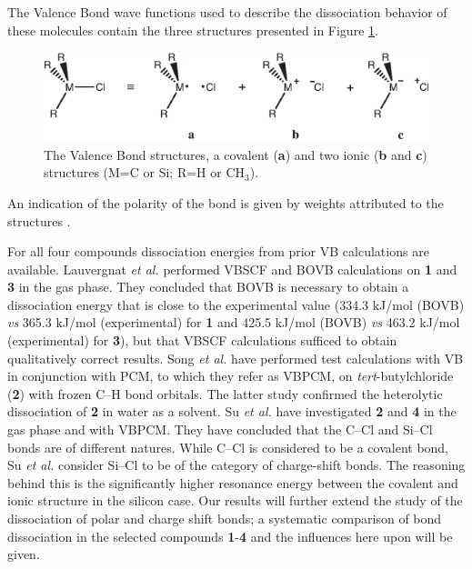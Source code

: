 The Valence Bond wave functions used to describe the dissociation behavior of these molecules contain the three structures presented in Figure \ref{ch3.fig.structures}.
\begin{figure}[htbp]
\begin{center}
\includegraphics{dissociation/figures/structures.eps}
\end{center}
\caption{The Valence Bond structures, a covalent (\textbf{a}) and two ionic (\textbf{b} and \textbf{c}) structures (M=C or Si; R=H or CH$_3$).}
\label{ch3.fig.structures}
\end{figure}
An indication of the polarity of the bond is given by weights attributed to the structures \cite{coulson}. 

For all four compounds dissociation energies from prior VB calculations are available. Lauvergnat \textit{et al.} \cite{lauvergnat} performed VBSCF \cite{vbscf1,vbscf2} and BOVB \cite{bovb1,bovb2,bovb3} calculations on \textbf{1} and \textbf{3} in the gas phase. They concluded that BOVB is necessary to obtain a dissociation energy that is close to the experimental value (334.3 kJ/mol (BOVB) \textit{vs} 365.3 kJ/mol (experimental) for \textbf{1} and 425.5 kJ/mol (BOVB) \textit{vs} 463.2 kJ/mol (experimental) for \textbf{3}), but that VBSCF calculations sufficed to obtain qualitatively correct results.  Song \textit{et al.} \cite{song} have performed test calculations with VB in conjunction with PCM, to which they refer as VBPCM, on \textit{tert}-butylchloride (\textbf{2}) with frozen C--H bond orbitals. The latter study confirmed the heterolytic dissociation of \textbf{2} in water as a solvent. Su \textit{et al.} \cite{psu} have investigated \textbf{2} and \textbf{4} in the gas phase and with VBPCM. They have concluded that the C--Cl and Si--Cl bonds are of different natures. While C--Cl is considered to be a covalent bond, Su \textit{et al.} consider Si--Cl to be of the category of charge-shift bonds. The reasoning behind this is the significantly higher resonance energy between the covalent and ionic structure in the silicon case. Our results will further extend the study of the dissociation of polar and charge shift bonds; a systematic comparison of bond dissociation in the selected compounds \textbf{1}-\textbf{4} and the influences here upon will be given.

